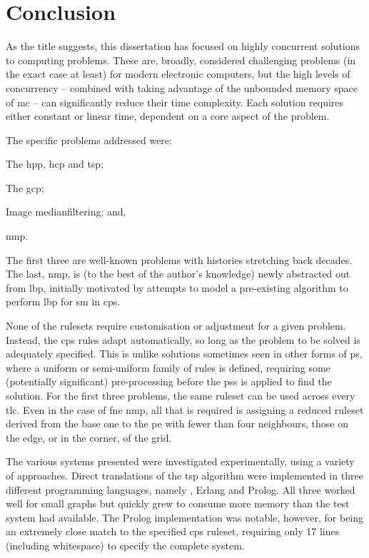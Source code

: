 \chapter{\label{chap:conc}Conclusion}

As the title suggests, this dissertation has focused on highly concurrent solutions to computing problems.  These are, broadly, considered challenging problems (in the exact case at least) for modern electronic computers, but the high levels of concurrency -- combined with taking advantage of the unbounded memory space of \gls{mc} -- can significantly reduce their time complexity.  Each solution requires either constant or linear time, dependent on a core aspect of the problem.

The specific problems addressed were:
\begin{inparaenum}[(1)]
\item The \gls{hpp}, \gls{hcp} and \gls{tsp};
\item The \gls{gcp};
\item Image \gls{medianfilter}ing; and,
\item \gls{nmp}.
\end{inparaenum}
The first three are well-known problems with histories stretching back decades.  The last, \gls{nmp}, is (to the best of the author's knowledge) newly abstracted out from \gls{lbp}, initially motivated by attempts to model a pre-existing algorithm to perform \gls{lbp} for \gls{sm} in \gls{cps}.

None of the \glspl{ruleset} require customisation or adjustment for a given problem.  Instead, the \gls{cps} rules adapt automatically, so long as the problem to be solved is adequately specified.  This is unlike solutions sometimes seen in other forms of \gls{ps}, where a uniform or semi-uniform family of rules is defined, requiring some (potentially significant) pre-processing before the \glspl{ps} is applied to find the solution.  For the first three problems, the same \gls{ruleset} can be used across every \gls{tlc}.  Even in the case of \gls{fne} \gls{nmp}, all that is required is assigning a reduced \gls{ruleset} derived from the base one to the \gls{pe} with fewer than four neighbours, \ie{} those on the edge, or in the corner, of the grid.

The various systems presented were investigated experimentally, using a variety of approaches.  Direct translations of the \gls{tsp} algorithm were implemented in three different programming languages, namely \fsharp{}, Erlang and Prolog.  All three worked well for small graphs but quickly grew to consume more memory than the test system had available.  The Prolog implementation was notable, however, for being an extremely close match to the specified \gls{cps} \gls{ruleset}, requiring only 17 lines (including whitespace) to specify the complete system.

